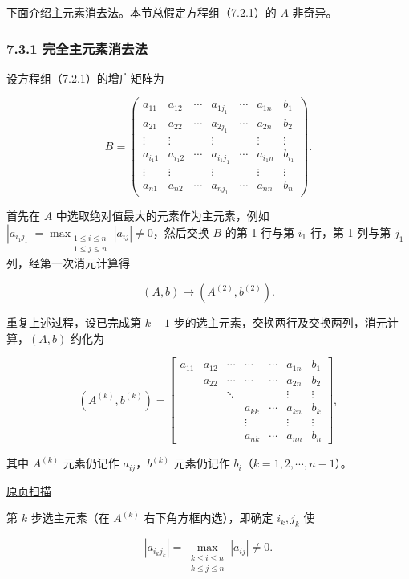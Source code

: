 \documentclass[
  10pt,
  fontset=fandol]{ctexart}
\begin{document}
下面介绍主元素消去法。本节总假定方程组（7.2.1）的 \(A\) 非奇异。

\subsubsection{7.3.1 完全主元素消去法}\label{ux5b8cux5168ux4e3bux5143ux7d20ux6d88ux53bbux6cd5}

设方程组（7.2.1）的增广矩阵为

\[
B=\left(\begin{array}{cccccc|c}
a_{11}&a_{12}&\cdots&a_{1j_1}&\cdots&a_{1n}&b_1\\
a_{21}&a_{22}&\cdots&a_{2j_1}&\cdots&a_{2n}&b_2\\
\vdots&\vdots&&\vdots&&\vdots&\vdots\\
a_{i_1 1}&a_{i_1 2}&\cdots&a_{i_1j_1}&\cdots&a_{i_1 n}&b_{i_1}\\
\vdots&\vdots&&\vdots&&\vdots&\vdots\\
a_{n1}&a_{n2}&\cdots&a_{nj_1}&\cdots&a_{nn}&b_n
\end{array}\right).
\]

首先在 \(A\) 中选取绝对值最大的元素作为主元素，例如 \(|a_{i_1j_1}|=\max_{\substack{1\le i\le n\\1\le j\le n}}|a_{ij}|\ne0\)，然后交换 \(B\) 的第 1 行与第 \(i_1\) 行，第 1 列与第 \(j_1\) 列，经第一次消元计算得

\[(A,b)\to(A^{(2)},b^{(2)}).\]

重复上述过程，设已完成第 \(k-1\) 步的选主元素，交换两行及交换两列，消元计算，\((A,b)\) 约化为

\[
(A^{(k)},b^{(k)})=\left[\begin{array}{cccccc|c}
a_{11}&a_{12}&\cdots&\cdots&\cdots&a_{1n}&b_1\\
&a_{22}&\cdots&\cdots&\cdots&a_{2n}&b_2\\
&&\ddots&&&\vdots&\vdots\\
&&&a_{kk}&\cdots&a_{kn}&b_k\\
&&&\vdots&&\vdots&\vdots\\
&&&a_{nk}&\cdots&a_{nn}&b_n
\end{array}\right],
\]

其中 \(A^{(k)}\) 元素仍记作 \(a_{ij}\)，\(b^{(k)}\) 元素仍记作 \(b_i\)（\(k=1,2,\cdots,n-1\)）。

\href{../../source-images/pdf-186.jpeg}{原页扫描}

第 \(k\) 步选主元素（在 \(A^{(k)}\) 右下角方框内选），即确定 \(i_k,j_k\) 使

\[|a_{i_kj_k}|=\max_{\substack{k\le i\le n\\k\le j\le n}}|a_{ij}|\ne0.\]
\end{document}
